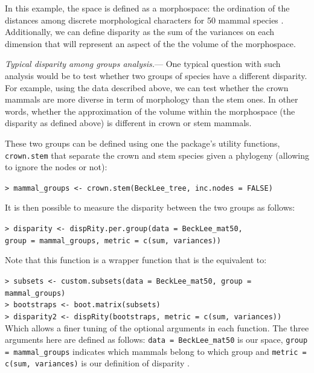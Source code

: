 \documentclass[12pt,letterpaper]{article}
\renewcommand{\subsubsection}[1]{%
\vspace{2ex}
\noindent
\textit{#1.}---}
\begin{document}
In this example, the space is defined as a morphospace: the ordination of the distances among discrete morphological characters for 50 mammal species \citep[from][]{beckancient2014}.
Additionally, we can define disparity as the sum of the variances on each dimension \citep{foote1991morphological,Wills1994} that will represent an aspect of the the volume of the morphospace.

\subsubsection{Typical disparity among groups analysis}
One typical question with such analysis would be to test whether two groups of species have a different disparity.
For example, using the data described above, we can test whether the crown mammals are more diverse in term of morphology than the stem ones.
In other words, whether the approximation of the volume within the morphospace (the disparity as defined above) is different in crown or stem mammals.

\noindent These two groups can be defined using one the package's utility functions, \texttt{crown.stem} that separate the crown and stem species given a phylogeny (allowing to ignore the nodes or not):

\noindent
\texttt{> mammal\_groups <- crown.stem(BeckLee\_tree, inc.nodes = FALSE)}

\noindent It is then possible to measure the disparity between the two groups as follows:

\noindent
\texttt{> disparity <- dispRity.per.group(data = BeckLee\_mat50,}\\
\texttt{group = mammal\_groups, metric = c(sum, variances))}

\noindent Note that this function is a wrapper function that is the equivalent to:

\noindent
\texttt{> subsets <- custom.subsets(data = BeckLee\_mat50, group = mammal\_groups)}\\
\noindent
\texttt{> bootstraps <- boot.matrix(subsets)}\\
\noindent
\texttt{> disparity2 <- dispRity(bootstraps, metric = c(sum, variances))}\\

\noindent Which allows a finer tuning of the optional arguments in each function.
The three arguments here are defined as follows: \texttt{data = BeckLee\_mat50} is our space, \texttt{group = mammal\_groups} indicates which mammals belong to which group and \texttt{metric = c(sum, variances)} is our definition of disparity \citep{foote1991morphological,Wills1994,Ciampaglio2001}. 
\end{document}
